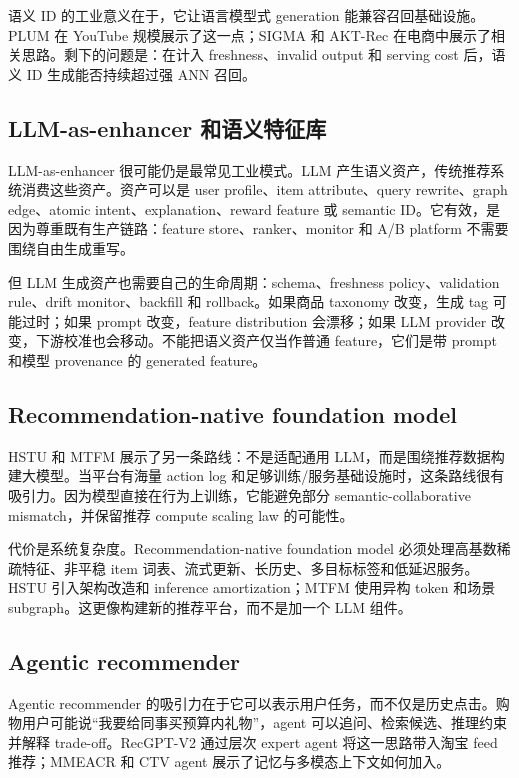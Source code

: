 \documentclass[UTF8,fontset=fandol,11pt]{ctexart}
\begin{document}
语义 ID 的工业意义在于，它让语言模型式 generation 能兼容召回基础设施。PLUM 在 YouTube 规模展示了这一点；SIGMA 和 AKT-Rec 在电商中展示了相关思路。剩下的问题是：在计入 freshness、invalid output 和 serving cost 后，语义 ID 生成能否持续超过强 ANN 召回。

\subsection{LLM-as-enhancer 和语义特征库}

LLM-as-enhancer 很可能仍是最常见工业模式。LLM 产生语义资产，传统推荐系统消费这些资产。资产可以是 user profile、item attribute、query rewrite、graph edge、atomic intent、explanation、reward feature 或 semantic ID。它有效，是因为尊重既有生产链路：feature store、ranker、monitor 和 A/B platform 不需要围绕自由生成重写。

但 LLM 生成资产也需要自己的生命周期：schema、freshness policy、validation rule、drift monitor、backfill 和 rollback。如果商品 taxonomy 改变，生成 tag 可能过时；如果 prompt 改变，feature distribution 会漂移；如果 LLM provider 改变，下游校准也会移动。不能把语义资产仅当作普通 feature，它们是带 prompt 和模型 provenance 的 generated feature。

\subsection{Recommendation-native foundation model}

HSTU 和 MTFM 展示了另一条路线：不是适配通用 LLM，而是围绕推荐数据构建大模型。当平台有海量 action log 和足够训练/服务基础设施时，这条路线很有吸引力。因为模型直接在行为上训练，它能避免部分 semantic-collaborative mismatch，并保留推荐 compute scaling law 的可能性。

代价是系统复杂度。Recommendation-native foundation model 必须处理高基数稀疏特征、非平稳 item 词表、流式更新、长历史、多目标标签和低延迟服务。HSTU 引入架构改造和 inference amortization；MTFM 使用异构 token 和场景 subgraph。这更像构建新的推荐平台，而不是加一个 LLM 组件。

\subsection{Agentic recommender}

Agentic recommender 的吸引力在于它可以表示用户任务，而不仅是历史点击。购物用户可能说“我要给同事买预算内礼物”，agent 可以追问、检索候选、推理约束并解释 trade-off。RecGPT-V2 通过层次 expert agent 将这一思路带入淘宝 feed 推荐；MMEACR 和 CTV agent 展示了记忆与多模态上下文如何加入。
\end{document}
